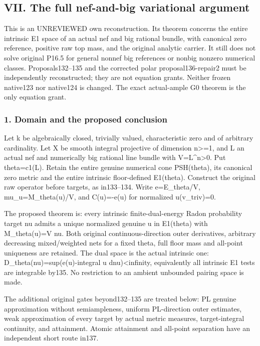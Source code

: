 \documentclass[
]{article}
\begin{document}
\subsection{VII. The full nef-and-big variational
argument}\label{vii.-the-full-nef-and-big-variational-argument}

This is an UNREVIEWED own reconstruction. Its theorem concerns the
entire intrinsic E1 space of an actual nef and big rational bundle, with
canonical zero reference, positive raw top mass, and the original
analytic carrier. It still does not solve original P16.5 for general
nonnef big references or nonbig nonzero numerical classes.
Proposals132--135 and the corrected polar proposal136-repair2 must be
independently reconstructed; they are not equation grants. Neither
frozen native123 nor native124 is changed. The exact actual-ample G0
theorem is the only equation grant.

\subsubsection{1. Domain and the proposed
conclusion}\label{domain-and-the-proposed-conclusion}

Let k be algebraically closed, trivially valued, characteristic zero and
of arbitrary cardinality. Let X be smooth integral projective of
dimension n\textgreater=1, and L an actual nef and numerically big
rational line bundle with V=L\^{}n\textgreater0. Put theta=c1(L). Retain
the entire genuine numerical cone PSH(theta), its canonical zero metric
and the entire intrinsic floor-defined E1(theta). Construct the original
raw operator before targets, as in133--134. Write e=E\_theta/V,
mu\_u=M\_theta(u)/V, and C(u)=-e(u) for normalized u(v\_triv)=0.

The proposed theorem is: every intrinsic finite-dual-energy Radon
probability target nu admits a unique normalized genuine u in E1(theta)
with M\_theta(u)=V nu. Both original continuous-direction outer
derivatives, arbitrary decreasing mixed/weighted nets for a fixed theta,
full floor mass and all-point uniqueness are retained. The dual space is
the actual intrinsic one: D\_theta(nu)=sup(e(u)-integral u
dnu)\textless infinity, equivalently all intrinsic E1 tests are
integrable by135. No restriction to an ambient unbounded pairing space
is made.

The additional original gates beyond132--135 are treated below: PL
genuine approximation without semiampleness, uniform PL-direction outer
estimates, weak approximation of every target by actual metric measures,
target-integral continuity, and attainment. Atomic attainment and
all-point separation have an independent short route in137.
\end{document}
